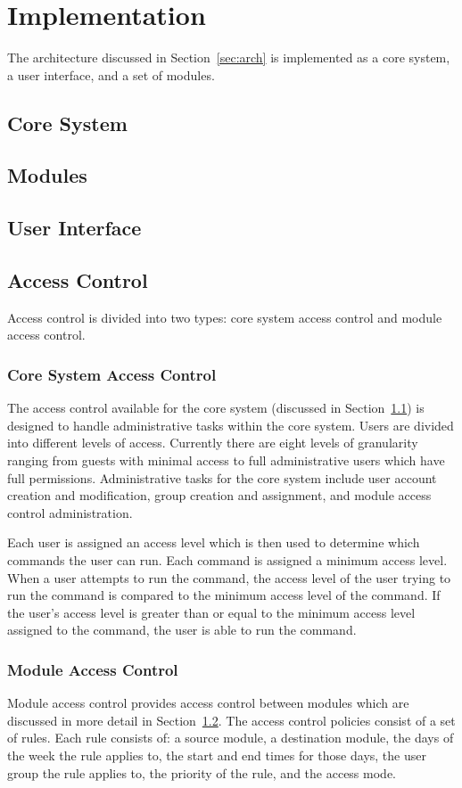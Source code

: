 \section{Implementation}
\label{sec:implementation}
The architecture discussed in Section~\ref{sec:arch} is implemented as a core
system, a user interface, and a set of modules.
\subsection{Core System}
\label{sec:core}
\subsection{Modules}
\label{sec:modules}
\subsection{User Interface}
\label{sec:interface}
\subsection{Access Control}
\label{sec:access}
Access control is divided into two types: core system access control and module
access control.
\subsubsection{Core System Access Control}
The access control available for the core system (discussed in
Section~\ref{sec:core}) is designed to handle administrative tasks within the
core system. Users are divided into different levels of access. Currently there
are eight levels of granularity ranging from guests with minimal access to
full administrative users which have full permissions. Administrative tasks for
the core system include user account creation and modification, group creation
and assignment, and module access control administration.

Each user is assigned an access level which is then used to determine which
commands the user can run. Each command is assigned a minimum access level.
When a user attempts to run the command, the access level of the user trying to
run the command is compared to the minimum access level of the command. If the
user's access level is greater than or equal to the minimum access level
assigned to the command, the user is able to run the command.
\subsubsection{Module Access Control}
Module access control provides access control between modules which are
discussed in more detail in Section~\ref{sec:modules}. The access control
policies consist of a set of rules. Each rule consists of: a source module, a
destination module, the days of the week the rule applies to, the start and end
times for those days, the user group the rule applies to, the priority of the
rule, and the access mode.

